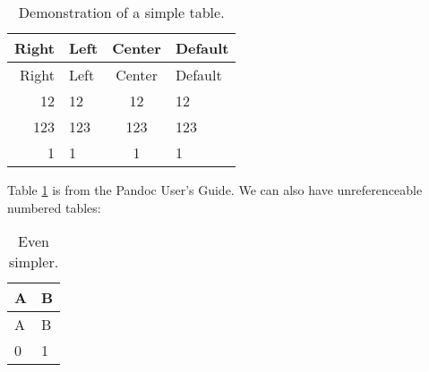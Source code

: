 \begin{longtable}[c]{@{}rlcl@{}}
\caption{Demonstration of a simple
table.\label{tbl:demo}}\tabularnewline
\toprule
Right & Left & Center & Default\tabularnewline
\midrule
\endfirsthead
\toprule
Right & Left & Center & Default\tabularnewline
\midrule
\endhead
12 & 12 & 12 & 12\tabularnewline
123 & 123 & 123 & 123\tabularnewline
1 & 1 & 1 & 1\tabularnewline
\bottomrule
\end{longtable}

Table \ref{tbl:demo} is from the Pandoc User's Guide. We can also have
unreferenceable numbered tables:

\begin{longtable}[c]{@{}ll@{}}
\caption{Even
simpler.\label{tbl:__-7600804473117309096__}}\tabularnewline
\toprule
A & B\tabularnewline
\midrule
\endfirsthead
\toprule
A & B\tabularnewline
\midrule
\endhead
0 & 1\tabularnewline
\bottomrule
\end{longtable}
